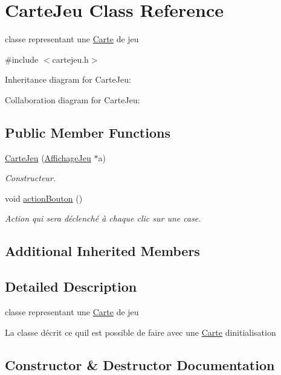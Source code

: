 \hypertarget{class_carte_jeu}{}\section{Carte\+Jeu Class Reference}
\label{class_carte_jeu}


classe representant une \hyperlink{class_carte}{Carte} de jeu  




{\ttfamily \#include $<$cartejeu.\+h$>$}



Inheritance diagram for Carte\+Jeu\+:


Collaboration diagram for Carte\+Jeu\+:
\subsection*{Public Member Functions}
\begin{DoxyCompactItemize}
\item 
\hyperlink{class_carte_jeu_a5c18cd639d1e3f69acb77056623fcb9a}{Carte\+Jeu} (\hyperlink{class_affichage_jeu}{Affichage\+Jeu} $\ast$a)
\begin{DoxyCompactList}\small\item\em Constructeur. \end{DoxyCompactList}\item 
void \hyperlink{class_carte_jeu_a9ba23d5a5b1e5d297c68ebd478f20a57}{action\+Bouton} ()
\begin{DoxyCompactList}\small\item\em Action qui sera déclenché à chaque clic sur une case. \end{DoxyCompactList}\end{DoxyCompactItemize}
\subsection*{Additional Inherited Members}


\subsection{Detailed Description}
classe representant une \hyperlink{class_carte}{Carte} de jeu 

La classe décrit ce qu\textquotesingle{}il est possible de faire avec une \hyperlink{class_carte}{Carte} d\textquotesingle{}initialisation 

\subsection{Constructor \& Destructor Documentation}
